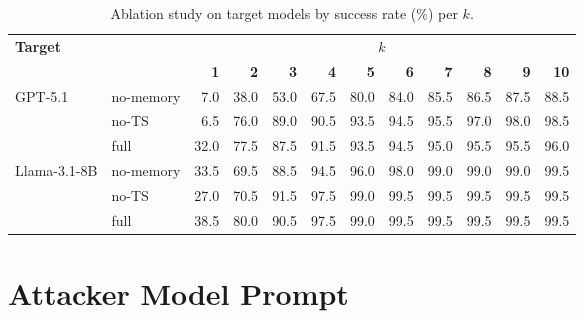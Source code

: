 \documentclass[a4paper,fleqn]{cas-sc}
\begin{document}
\begin{table}[htbp]
  \centering
  \caption{Ablation study on target models by success rate (\%) per $k$.}
  \label{tab:ablation_full}
  \footnotesize
  \begin{tabular}{@{}llrrrrrrrrrr@{}} \toprule
    \multirow{2}{*}{\textbf{Target}} &           & \multicolumn{10}{c}{\bfseries\boldmath $k$}                                                                                                                       \\ \cmidrule(lr){3-12}
                                     &           & \textbf{1}                                  & \textbf{2} & \textbf{3} & \textbf{4} & \textbf{5} & \textbf{6} & \textbf{7} & \textbf{8} & \textbf{9} & \textbf{10} \\ \midrule
    \multirow{3}{*}{GPT-5.1}
                                     & no-memory & 7.0                                         & 38.0       & 53.0       & 67.5       & 80.0       & 84.0       & 85.5       & 86.5       & 87.5       & 88.5        \\
                                     & no-TS     & 6.5                                         & 76.0       & 89.0       & 90.5       & 93.5       & 94.5       & 95.5       & 97.0       & 98.0       & 98.5        \\
                                     & full      & 32.0                                        & 77.5       & 87.5       & 91.5       & 93.5       & 94.5       & 95.0       & 95.5       & 95.5       & 96.0        \\ \midrule
    \multirow{3}{*}{Llama-3.1-8B}
                                     & no-memory & 33.5                                        & 69.5       & 88.5       & 94.5       & 96.0       & 98.0       & 99.0       & 99.0       & 99.0       & 99.5        \\
                                     & no-TS     & 27.0                                        & 70.5       & 91.5       & 97.5       & 99.0       & 99.5       & 99.5       & 99.5       & 99.5       & 99.5        \\
                                     & full      & 38.5                                        & 80.0       & 90.5       & 97.5       & 99.0       & 99.5       & 99.5       & 99.5       & 99.5       & 99.5        \\ \bottomrule
  \end{tabular}
\end{table}

\section{Attacker Model Prompt}
\label{app:attack_prompt}
\end{document}
